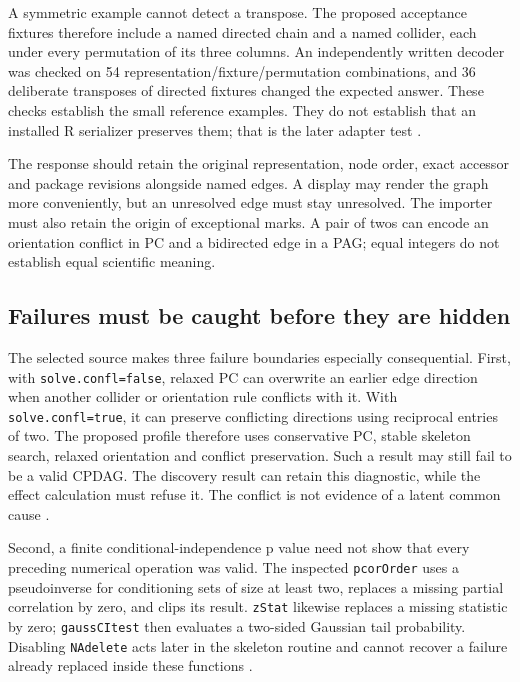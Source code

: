 A symmetric example cannot detect a transpose. The proposed acceptance
fixtures therefore include a named directed chain and a named collider,
each under every permutation of its three columns. An independently
written decoder was checked on 54 representation/fixture/permutation
combinations, and 36 deliberate transposes of directed fixtures changed
the expected answer. These checks establish the small reference
examples. They do not establish that an installed R serializer preserves
them; that is the later adapter test
\citep{exec13_pcalg_reuse_examples}.

The response should retain the original representation, node order,
exact accessor and package revisions alongside named edges. A display
may render the graph more conveniently, but an unresolved edge must stay
unresolved. The importer must also retain the origin of exceptional
marks. A pair of twos can encode an orientation conflict in PC and a
bidirected edge in a PAG; equal integers do not establish equal
scientific meaning.

\hypertarget{failures-must-be-caught-before-they-are-hidden}{%
\subsection{Failures must be caught before they are
hidden}\label{failures-must-be-caught-before-they-are-hidden}}

The selected source makes three failure boundaries especially
consequential. First, with \texttt{solve.confl=false}, relaxed PC can
overwrite an earlier edge direction when another collider or orientation
rule conflicts with it. With \texttt{solve.confl=true}, it can preserve
conflicting directions using reciprocal entries of two. The proposed
profile therefore uses conservative PC, stable skeleton search, relaxed
orientation and conflict preservation. Such a result may still fail to
be a valid CPDAG. The discovery result can retain this diagnostic, while
the effect calculation must refuse it. The conflict is not evidence of a
latent common cause \citep{exec13_pcalg_reuse_primary}.

Second, a finite conditional-independence p value need not show that
every preceding numerical operation was valid. The inspected
\texttt{pcorOrder} uses a pseudoinverse for conditioning sets of size at
least two, replaces a missing partial correlation by zero, and clips its
result. \texttt{zStat} likewise replaces a missing statistic by zero;
\texttt{gaussCItest} then evaluates a two-sided Gaussian tail
probability. Disabling \texttt{NAdelete} acts later in the skeleton
routine and cannot recover a failure already replaced inside these
functions \citep{exec13_pcalg_reuse_primary}.

